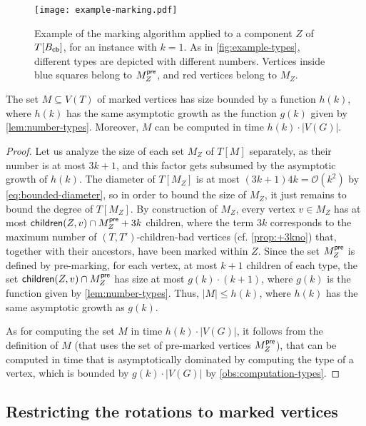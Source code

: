 \documentclass[a4paper,UKenglish,cleveref, autoref, thm-restate]{lipics-v2021}
\newcommand{\child}{{\sf children}\xspace}
\newcommand{\Bcb}{B_{\sf cb}\xspace}
\newcommand{\Ocal}{{\mathcal O}\xspace}
\begin{document}
\begin{figure}[h!tb]
    \centering
    \vspace{-.25cm}
    \hspace{-.75cm}\texttt{[image: example-marking.pdf]}
    \caption{Example of the marking algorithm applied to a component $Z$ of $T[\Bcb]$, for an instance with $k=1$. As in \autoref{fig:example-types}, different types are depicted with different numbers. Vertices inside blue squares belong to $M_Z^{\sf pre}$, and red vertices belong to $M_Z$.\label{fig:example-marking}}
\end{figure}



\begin{lemma}\label{lem:M-bounded}
The set $M \subseteq V(T)$ of marked vertices has size bounded by a function $h(k)$,  where $h(k)$ has the same asymptotic growth as the function $g(k)$ given by \autoref{lem:number-types}. Moreover, $M$ can be computed in time $h(k) \cdot |V(G)|$.
\end{lemma}
\begin{proof}
  Let us analyze the size of each set $M_Z$ of $T[M]$ separately, as their number is at most $3k+1$, and this factor gets subsumed by the asymptotic growth of $h(k)$. The diameter of $T[M_Z]$ is at most $(3k+1)4k = \Ocal(k^2)$ by \autoref{eq:bounded-diameter}, so in order to bound the size of $M_Z$, it just remains to bound the degree of $T[M_Z]$. By construction of $M_Z$, every vertex $v \in M_Z$ has at most $\child(Z,v) \cap M_Z^{\sf pre} + 3k$ children, where the term $3k$ corresponds to the maximum number of $(T,T')$-children-bad vertices (cf. \autoref{prop:+3kno}) that, together with their ancestors, have been marked within $Z$. Since the set $M_Z^{\sf pre}$ is defined by pre-marking, for each vertex, at most $k+1$ children of each type, the set $\child(Z,v) \cap M_Z^{\sf pre}$ has size at most $g(k) \cdot (k+1)$, where $g(k)$ is the function given by \autoref{lem:number-types}. Thus, $|M| \leq h(k)$, where $h(k)$ has the same asymptotic growth as $g(k)$.

  As for computing the set $M$ in time $h(k) \cdot |V(G)|$, it follows from the definition of $M$ (that uses the set of pre-marked vertices $M_Z^{\sf pre}$), that can be computed in time that is asymptotically dominated by computing the type of a vertex, which is bounded by $g(k) \cdot |V(G)|$ by \autoref{obs:computation-types}.
\end{proof}

\subsection{Restricting the rotations to marked vertices}
\label{sec:restriction-to-marked}
\end{document}
